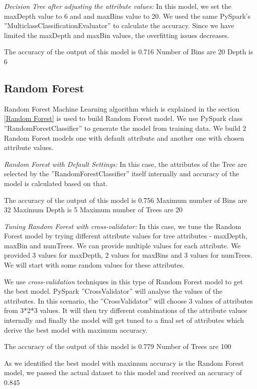 \documentclass[sigconf]{acmart}
\begin{document}
\textit{Decision Tree after adjusting the attribute values:} In this model, we set the maxDepth value to 6 and and maxBins value to 20. We used the same PySpark's ''MulticlassClassificationEvaluator'' to calculate the accuracy. Since we have limited the maxDepth and maxBin values, the overfitting issues decreases.

The accuracy of the output of this model is 0.716
Number of Bins are 20
Depth is 6

\subsection{Random Forest}

Random Forest Machine Learning algorithm which is explained in the section \ref{Random Forest} is used to build Random Forest model. We use PySpark class ''RandomForestClassifier'' to generate the model from training data. We build 2 Random Forest models one with default attribute and another one with chosen attribute values. 

\textit{Random Forest with Default Settings:} In this case, the attributes of the Tree are selected by the ''RandomForestClassifier'' itself internally and accuracy of the model is calculated based on that.

The accuracy of the output of this model is 0.756
Maximum number of Bins are 32
Maximum Depth is 5
Maximum number of Trees are 20


\textit{Tuning Random Forest with cross-validator:} In this case, we tune the Random Forest model by trying different attribute values for tree  attributes - maxDepth, maxBin and numTrees. We can provide multiple values for each attribute. We provided 3 values for maxDepth, 2 values for maxBins and 3 values for numTrees. We will start with some random values for these attributes. 

We use \emph{cross-validation} techniques in this type of Random Forest model to get the best model. PySpark ''CrossValidator'' will analyse the values of the attributes. In this scenario, the ''CrossValidator'' will choose 3 values of attributes from 3*2*3 values. It will then try different combinations of the attribute values internally and finally the model will get tuned to a final set of attributes which derive the best model with maximum accuracy. 

The accuracy of the output of this model is 0.779
Number of Trees are 100

As we identified the best model with maximum accuracy is the Random Forest model, we passed the actual dataset to this model and received an accuracy of 0.845
\end{document}
